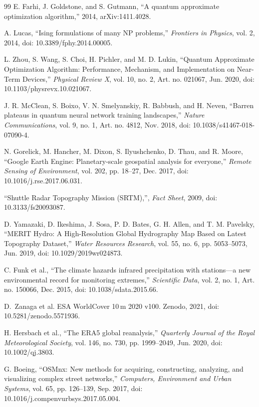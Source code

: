 \begin{thebibliography}{99}
E. Farhi, J. Goldstone, and S. Gutmann, ``A quantum approximate optimization algorithm,'' 2014, arXiv:1411.4028.

A. Lucas, ``Ising formulations of many NP problems,'' \emph{Frontiers in Physics}, vol. 2, 2014, doi: 10.3389/fphy.2014.00005.

L. Zhou, S. Wang, S. Choi, H. Pichler, and M. D. Lukin, ``Quantum Approximate Optimization Algorithm: Performance, Mechanism, and Implementation on Near-Term Devices,'' \emph{Physical Review X}, vol. 10, no. 2, Art. no. 021067, Jun. 2020, doi: 10.1103/physrevx.10.021067.

J. R. McClean, S. Boixo, V. N. Smelyanskiy, R. Babbush, and H. Neven, ``Barren plateaus in quantum neural network training landscapes,'' \emph{Nature Communications}, vol. 9, no. 1, Art. no. 4812, Nov. 2018, doi: 10.1038/s41467-018-07090-4.

N. Gorelick, M. Hancher, M. Dixon, S. Ilyushchenko, D. Thau, and R. Moore, ``Google Earth Engine: Planetary-scale geospatial analysis for everyone,'' \emph{Remote Sensing of Environment}, vol. 202, pp. 18--27, Dec. 2017, doi: 10.1016/j.rse.2017.06.031.

``Shuttle Radar Topography Mission (SRTM),'', \emph{Fact Sheet}, 2009, doi: 10.3133/fs20093087.

D. Yamazaki, D. Ikeshima, J. Sosa, P. D. Bates, G. H. Allen, and T. M. Pavelsky, ``MERIT Hydro: A High-Resolution Global Hydrography Map Based on Latest Topography Dataset,'' \emph{Water Resources Research}, vol. 55, no. 6, pp. 5053--5073, Jun. 2019, doi: 10.1029/2019wr024873.

C. Funk et al., ``The climate hazards infrared precipitation with stations---a new environmental record for monitoring extremes,'' \emph{Scientific Data}, vol. 2, no. 1, Art. no. 150066, Dec. 2015, doi: 10.1038/sdata.2015.66.

D.~Zanaga et al. ESA WorldCover 10\,m 2020 v100. Zenodo, 2021, doi: 10.5281/zenodo.5571936.

H. Hersbach et al., ``The ERA5 global reanalysis,'' \emph{Quarterly Journal of the Royal Meteorological Society}, vol. 146, no. 730, pp. 1999--2049, Jun. 2020, doi: 10.1002/qj.3803.

G. Boeing, ``OSMnx: New methods for acquiring, constructing, analyzing, and visualizing complex street networks,'' \emph{Computers, Environment and Urban Systems}, vol. 65, pp. 126--139, Sep. 2017, doi: 10.1016/j.compenvurbsys.2017.05.004.


\end{thebibliography}
